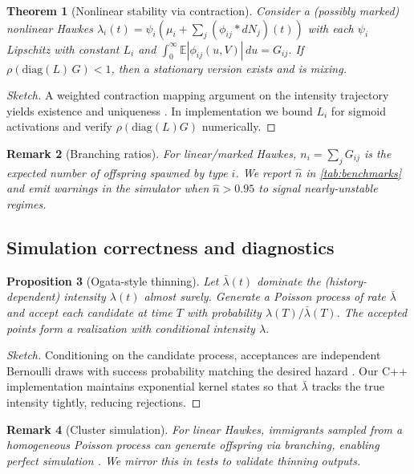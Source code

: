 \documentclass[11pt]{article}
\newtheorem{theorem}{Theorem}[section]
\newtheorem{proposition}[theorem]{Proposition}
\newtheorem{remark}[theorem]{Remark}
\newcommand{\E}{\mathbb{E}}
\newcommand{\1}{\mathbbm{1}}
\begin{document}
\begin{theorem}[Nonlinear stability via contraction]
Consider a (possibly marked) nonlinear Hawkes $\lambda_i(t)=\psi_i\!\left(\mu_i+\sum_j(\phi_{ij}\ast dN_j)(t)\right)$ with each $\psi_i$ Lipschitz with constant $L_i$ and $\int_0^\infty \E|\phi_{ij}(u,V)|\,du = G_{ij}$. If $\rho(\mathrm{diag}(L)\,G)<1$, then a stationary version exists and is mixing.
\end{theorem}
\begin{proof}[Sketch]
A weighted contraction mapping argument on the intensity trajectory yields existence and uniqueness \cite{BremaudMassoulie1996}. In implementation we bound $L_i$ for sigmoid activations and verify $\rho(\mathrm{diag}(L)G)$ numerically.
\end{proof}

\begin{remark}[Branching ratios]
For linear/marked Hawkes, $n_i=\sum_j G_{ij}$ is the expected number of offspring spawned by type $i$. We report $\hat n$ in \cref{tab:benchmarks} and emit warnings in the simulator when $\hat n>0.95$ to signal nearly-unstable regimes.
\end{remark}

\subsection{Simulation correctness and diagnostics}
\begin{proposition}[Ogata-style thinning]
Let $\bar\lambda(t)$ dominate the (history-dependent) intensity $\lambda(t)$ almost surely. Generate a Poisson process of rate $\bar\lambda$ and accept each candidate at time $T$ with probability $\lambda(T)/\bar\lambda(T)$. The accepted points form a realization with conditional intensity $\lambda$.
\end{proposition}
\begin{proof}[Sketch]
Conditioning on the candidate process, acceptances are independent Bernoulli draws with success probability matching the desired hazard \cite{Ogata1981,LewisShedler1979}. Our C++ implementation maintains exponential kernel states so that $\bar\lambda$ tracks the true intensity tightly, reducing rejections.
\end{proof}

\begin{remark}[Cluster simulation]
For linear Hawkes, immigrants sampled from a homogeneous Poisson process can generate offspring via branching, enabling perfect simulation \cite{MollerRasmussen2005}. We mirror this in tests to validate thinning outputs.
\end{remark}
\end{document}
